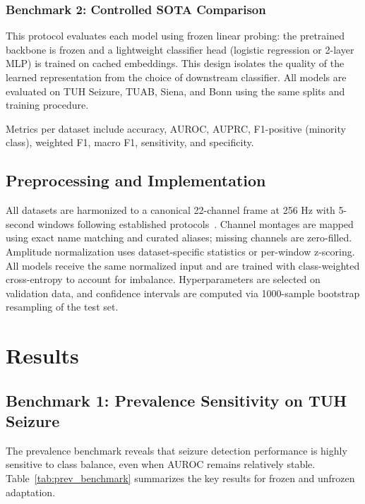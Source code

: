 \documentclass[journal]{IEEEtran}
\begin{document}
\subsubsection{Benchmark 2: Controlled SOTA Comparison}

This protocol evaluates each model using frozen linear probing: the pretrained backbone is frozen and a lightweight classifier head (logistic regression or 2-layer MLP) is trained on cached embeddings. This design isolates the quality of the learned representation from the choice of downstream classifier. All models are evaluated on TUH Seizure, TUAB, Siena, and Bonn using the same splits and training procedure.

Metrics per dataset include accuracy, AUROC, AUPRC, F1-positive (minority class), weighted F1, macro F1, sensitivity, and specificity.

\subsection{Preprocessing and Implementation}

All datasets are harmonized to a canonical 22-channel frame at 256 Hz with 5-second windows following established protocols~\cite{helwan2025diffeeg}. Channel montages are mapped using exact name matching and curated aliases; missing channels are zero-filled. Amplitude normalization uses dataset-specific statistics or per-window z-scoring. All models receive the same normalized input and are trained with class-weighted cross-entropy to account for imbalance. Hyperparameters are selected on validation data, and confidence intervals are computed via 1000-sample bootstrap resampling of the test set.

\section{Results}

\subsection{Benchmark 1: Prevalence Sensitivity on TUH Seizure}

The prevalence benchmark reveals that seizure detection performance is highly sensitive to class balance, even when AUROC remains relatively stable. Table~\ref{tab:prev_benchmark} summarizes the key results for frozen and unfrozen adaptation.
\end{document}
